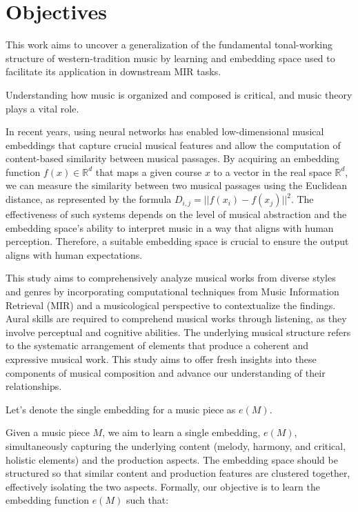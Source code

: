 \section{Objectives}

This work aims to uncover a generalization of the fundamental tonal-working structure of western-tradition music by learning and embedding space used to facilitate its application in downstream MIR tasks. 

Understanding how music is organized and composed is critical, and music theory plays a vital role.

In recent years, using neural networks has enabled low-dimensional musical embeddings that capture crucial musical features and allow the computation of content-based similarity between musical passages. By acquiring an embedding function $f(x) \in \mathbb{R}^d$ that maps a given course $x$ to a vector in the real space $\mathbb{R}^d$, we can measure the similarity between two musical passages using the Euclidean distance, as represented by the formula $D_{i,j} = ||f(x_i) - f(x_j)||^2$. The effectiveness of such systems depends on the level of musical abstraction and the embedding space's ability to interpret music in a way that aligns with human perception. Therefore, a suitable embedding space is crucial to ensure the output aligns with human expectations.

This study aims to comprehensively analyze musical works from diverse styles and genres by incorporating computational techniques from Music Information Retrieval (MIR) and a musicological perspective to contextualize the findings. Aural skills are required to comprehend musical works through listening, as they involve perceptual and cognitive abilities. The underlying musical structure refers to the systematic arrangement of elements that produce a coherent and expressive musical work. This study aims to offer fresh insights into these components of musical composition and advance our understanding of their relationships.

Let's denote the single embedding for a music piece as $e(M)$.

Given a music piece $M$, we aim to learn a single embedding, $e(M)$, simultaneously capturing the underlying content (melody, harmony, and critical, holistic elements) and the production aspects. The embedding space should be structured so that similar content and production features are clustered together, effectively isolating the two aspects. Formally, our objective is to learn the embedding function $e(M)$ such that:

